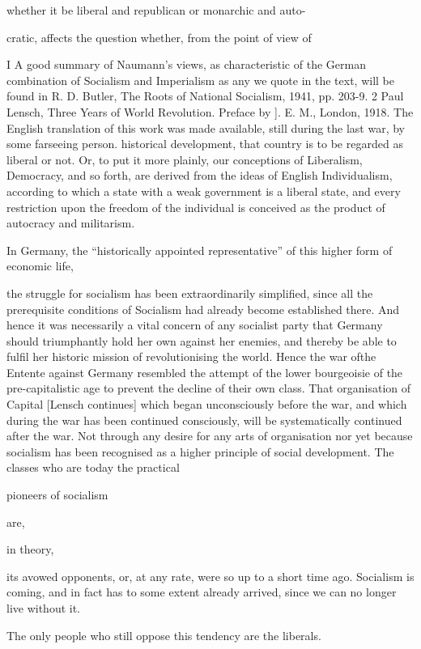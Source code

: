 \documentclass[11pt,openany]{book}
\begin{document}
whether it be liberal and republican or monarchic and auto-

cratic, affects the question whether, from the point of view of

I A good summary of Naumann's views, as characteristic of the German combination of Socialism and Imperialism as any we quote in the text, will be found in R. D. Butler, The Roots of National Socialism, 1941, pp. 203-9. 2 Paul Lensch, Three Years of World Revolution. Preface by ]. E. M., London, 1918. The English translation of this work was made available, still during the last war, by some farseeing person. historical development, that country is to be regarded as liberal or not. Or, to put it more plainly, our conceptions of Liberalism, Democracy, and so forth, are derived from the ideas of English Individualism, according to which a state with a weak government is a liberal state, and every restriction upon the freedom of the individual is conceived as the product of autocracy and militarism.

In Germany, the ``historically appointed representative'' of this higher form of economic life,

the struggle for socialism has been extraordinarily simplified, since all the prerequisite conditions of Socialism had already become established there. And hence it was necessarily a vital concern of any socialist party that Germany should triumphantly hold her own against her enemies, and thereby be able to fulfil her historic mission of revolutionising the world. Hence the war ofthe Entente against Germany resembled the attempt of the lower bourgeoisie of the pre-capitalistic age to prevent the decline of their own class. That organisation of Capital [Lensch continues] which began unconsciously before the war, and which during the war has been continued consciously, will be systematically continued after the war. Not through any desire for any arts of organisation nor yet because socialism has been recognised as a higher principle of social development. The classes who are today the practical

pioneers of socialism

are,

in theory,

its avowed opponents, or, at any rate, were so up to a short time ago. Socialism is coming, and in fact has to some extent already arrived, since we can no longer live without it.

The only people who still oppose this tendency are the liberals.
\end{document}
